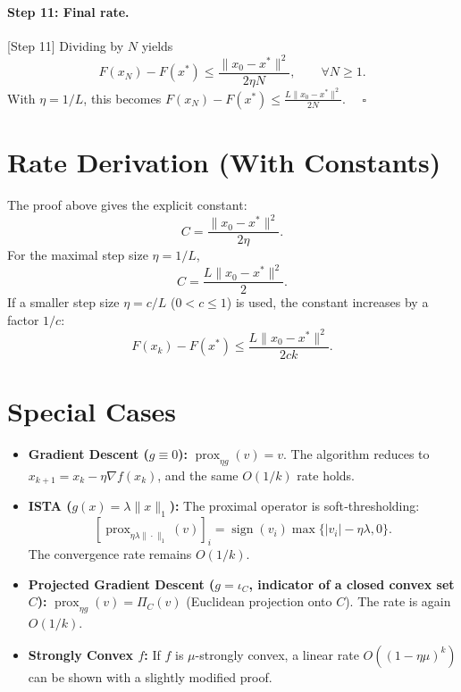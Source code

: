 \documentclass{article}
\begin{document}
\paragraph{Step 11: Final rate.} [Step 11]
Dividing by $N$ yields
\[
F(x_N) - F(x^*) \le \frac{\|x_0 - x^*\|^2}{2\eta N}, \qquad \forall N \ge 1.
\]
With $\eta = 1/L$, this becomes $F(x_N) - F(x^*) \le \frac{L\|x_0 - x^*\|^2}{2N}$. $\quad\square$

\section*{Rate Derivation (With Constants)}
The proof above gives the explicit constant:
\[
C = \frac{\|x_0 - x^*\|^2}{2\eta}.
\]
For the maximal step size $\eta = 1/L$,
\[
C = \frac{L \|x_0 - x^*\|^2}{2}.
\]
If a smaller step size $\eta = c/L$ ($0 < c \le 1$) is used, the constant increases by a factor $1/c$:
\[
F(x_k) - F(x^*) \le \frac{L \|x_0 - x^*\|^2}{2c k}.
\]

\section*{Special Cases}

\begin{itemize}
    \item \textbf{Gradient Descent ($g \equiv 0$):} $\operatorname{prox}_{\eta g}(v) = v$. The algorithm reduces to $x_{k+1} = x_k - \eta \nabla f(x_k)$, and the same $O(1/k)$ rate holds.
    \item \textbf{ISTA ($g(x) = \lambda \|x\|_1$):} The proximal operator is soft‑thresholding:
    \[
    [\operatorname{prox}_{\eta \lambda \|\cdot\|_1}(v)]_i = \operatorname{sign}(v_i) \max\{|v_i| - \eta\lambda, 0\}.
    \]
    The convergence rate remains $O(1/k)$.
    \item \textbf{Projected Gradient Descent ($g = \iota_C$, indicator of a closed convex set $C$):} $\operatorname{prox}_{\eta g}(v) = \Pi_C(v)$ (Euclidean projection onto $C$). The rate is again $O(1/k)$.
    \item \textbf{Strongly Convex $f$:} If $f$ is $\mu$-strongly convex, a linear rate $O((1-\eta\mu)^k)$ can be shown with a slightly modified proof.
\end{itemize}
\end{document}

